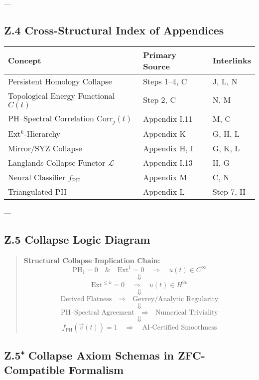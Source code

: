 \documentclass[11pt]{article}
\theoremstyle{definition}
\begin{document}
---

\subsection*{Z.4 Cross-Structural Index of Appendices}

\begin{tabular}{lll}
\textbf{Concept} & \textbf{Primary Source} & \textbf{Interlinks} \\
\hline
Persistent Homology Collapse & Steps 1–4, C & J, L, N \\
Topological Energy Functional $C(t)$ & Step 2, C & N, M \\
PH–Spectral Correlation $\mathrm{Corr}_j(t)$ & Appendix I.11 & M, C \\
Ext$^k$-Hierarchy & Appendix K & G, H, L \\
Mirror/SYZ Collapse & Appendix H, I & G, K, L \\
Langlands Collapse Functor $\mathcal{L}$ & Appendix I.13 & H, G \\
Neural Classifier $f_{\mathrm{PH}}$ & Appendix M & C, N \\
Triangulated PH & Appendix L & Step 7, H \\
\end{tabular}

---

\subsection*{Z.5 Collapse Logic Diagram}

\begin{quote}
\textbf{Structural Collapse Implication Chain:}
\[
\mathrm{PH}_1 = 0 \quad \& \quad \mathrm{Ext}^1 = 0 \quad \Rightarrow \quad u(t) \in C^\infty
\]
\[
\Downarrow
\]
\[
\mathrm{Ext}^{\leq k} = 0 \quad \Rightarrow \quad u(t) \in H^{2k}
\]
\[
\Downarrow
\]
\[
\text{Derived Flatness} \quad \Rightarrow \quad \text{Gevrey/Analytic Regularity}
\]
\[
\Downarrow
\]
\[
\text{PH–Spectral Agreement} \quad \Rightarrow \quad \text{Numerical Triviality}
\]
\[
\Downarrow
\]
\[
f_{\mathrm{PH}}(\vec{v}(t)) = 1 \quad \Rightarrow \quad \text{AI-Certified Smoothness}
\]
\end{quote}


\subsection*{Z.5⁺ Collapse Axiom Schemas in ZFC-Compatible Formalism}
\end{document}
